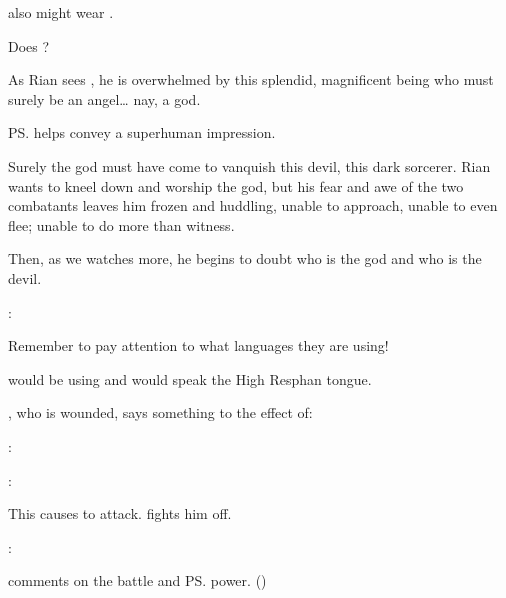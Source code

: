 \Teshrial{} also might wear . 

Does \Teshrial{} ?

As Rian sees \Teshrial, he is overwhelmed by this splendid, magnificent being who must surely be an angel\ldots{} nay, a god. 


\ps{\Teshrial}  helps convey a superhuman impression. 

Surely the god must have come to vanquish this devil, this dark sorcerer. Rian wants to kneel down and worship the god, but his fear and awe of the two combatants leaves him frozen and huddling, unable to approach, unable to even flee; unable to do more than witness.

Then, as we watches more, he begins to doubt who is the god and who is the devil. 

\Ishnaruchaefir: 

Remember to pay attention to what languages they are using! 

\Ishnaruchaefir{} would be using \Draconic{} and \Teshrial{} would speak the High Resphan tongue.

\Ishnaruchaefir{}, who is wounded, says something to the effect of: 

\Teshrial: 

\Ishnaruchaefir: 

This causes \Teshrial{} to attack. \Ishnaruchaefir{} fights him off. 

\Ishnaruchaefir: 

\Criseis{} comments on the battle and \ps{\Teshrial} power. ()






